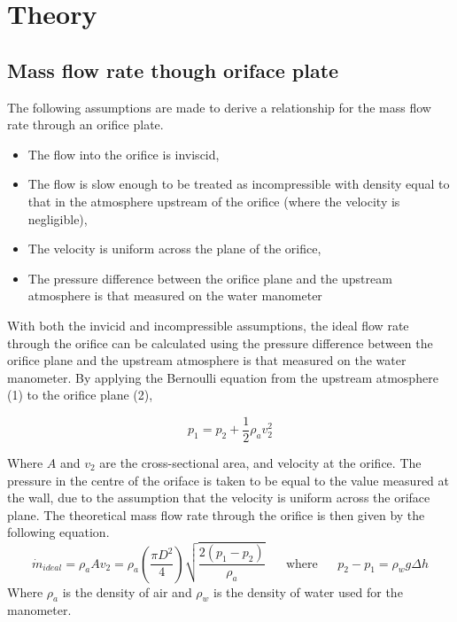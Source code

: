 \documentclass{article}
\begin{document}
\section{Theory}

\subsection{Mass flow rate though oriface plate}

The following assumptions are made to derive a relationship for the mass flow rate through an orifice plate.
\begin{itemize}
    \item The flow into the orifice is inviscid,
    \item The flow is slow enough to be treated as incompressible with density equal to that in the atmosphere upstream of the orifice (where the velocity is negligible),
    \item The velocity is uniform across the plane of the orifice,
    \item The pressure difference between the orifice plane and the upstream atmosphere is that measured on the water manometer
\end{itemize} 

With both the invicid and incompressible assumptions, the ideal flow rate through the orifice can be calculated using the pressure difference between the orifice plane and the upstream atmosphere is that measured on the
water manometer. By applying the Bernoulli equation from the upstream atmosphere (1) to the orifice plane (2),

\begin{equation}
    p_1 = p_2 + \frac{1}{2} \rho_a v_2^2
\end{equation}

Where $A$ and $v_2$ are the cross-sectional area, and velocity at the orifice. The pressure in the centre of the oriface is taken to be equal to the value measured at the wall, due to the assumption that the velocity is uniform across the oriface plane.
The theoretical mass flow rate through the orifice is then given by the following equation.
\begin{equation}
    \dot{m}_{ideal} = \rho_a A v_2 = \rho_a \left( \frac{\pi D^2}{4}\right) \sqrt{\frac{2(p_1-p_2)}{\rho_a}} \;\;\;\;\;\; \text{where} \;\;\;\;\;\ p_2 - p_1 = \rho_w g \Delta h
\end{equation}
Where $\rho_a$ is the density of air and $\rho_w$ is the density of water used for the manometer.
\end{document}
